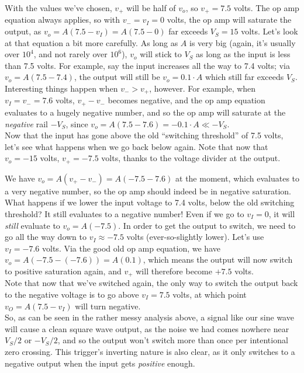\documentclass[12pt,a4paper]{report}
\begin{document}
With the values we've chosen, $v_+$ will be half of $v_o$, so $v_+ = 7.5$ volts. The op amp equation always applies, so with $v_- = v_I = 0$ volts, the op amp will saturate the output, as $v_o = A(7.5 - v_I) = A(7.5 - 0)$ far exceeds $V_S = 15$ volts. Let's look at that equation a bit more carefully. As long as $A$ is very big (again, it's usually over $10^4$, and not rarely over $10^6$), $v_o$ will stick to $V_S$ as long as the input is less than 7.5 volts. For example, say the input increases all the way to 7.4 volts; via $v_o = A(7.5 - 7.4)$, the output will still be $v_o = 0.1 \cdot A$ which still far exceeds $V_S$.\\
Interesting things happen when $v_- > v_+$, however. For example, when $v_I = v_- = 7.6$ volts, $v_+ - v_-$ becomes negative, and the op amp equation evaluates to a hugely negative number, and so the op amp will saturate at the \emph{negative} rail $-V_S$, since $v_o = A(7.5 - 7.6) = -0.1 \cdot A \ll -V_S$.\\

Now that the input has gone above the old ``switching threshold'' of 7.5 volts, let's see what happens when we go back below again. Note that now that $v_o = -15$ volts, $v_+ = -7.5$ volts, thanks to the voltage divider at the output.

We have $v_o = A(v_+ - v_-) = A(-7.5 - 7.6)$ at the moment, which evaluates to a very negative number, so the op amp should indeed be in negative saturation. What happens if we lower the input voltage to 7.4 volts, below the old switching threshold? It still evaluates to a negative number! Even if we go to $v_I = 0$, it will \emph{still} evaluate to $v_o = A(-7.5)$. In order to get the output to switch, we need to go all the way down to $v_I \approx -7.5$ volts (ever-so-slightly lower). Let's use $v_I = -7.6$ volts. Via the good old op amp equation, we have $v_o = A(-7.5 - (-7.6)) = A(0.1)$, which means the output will now switch to positive saturation again, and $v_+$ will therefore become $+7.5$ volts.\\

Note that now that we've switched again, the only way to switch the output back to the negative voltage is to go above $v_I = 7.5$ volts, at which point $v_O = A(7.5 - v_I)$ will turn negative.\\

So, as can be seen in the rather messy analysis above, a signal like our sine wave will cause a clean square wave output, as the noise we had comes nowhere near $V_S/2$ or $-V_S/2$, and so the output won't switch more than once per intentional zero crossing. This trigger's inverting nature is also clear, as it only switches to a negative output when the input gets \emph{positive} enough.\\
\end{document}
